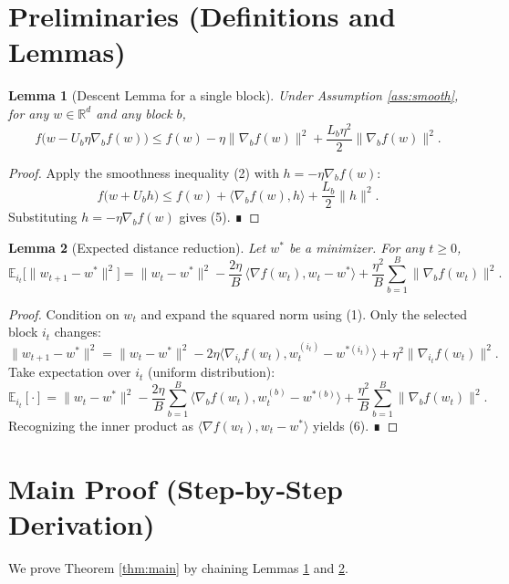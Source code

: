 \documentclass{article}
\newtheorem{lemma}{Lemma}
\newcommand{\E}{\mathbb{E}}
\newcommand{\R}{\mathbb{R}}
\begin{document}
\newpage
\section*{Preliminaries (Definitions and Lemmas)}
\begin{lemma}[Descent Lemma for a single block]\label{lem:descent}
Under Assumption \ref{ass:smooth}, for any $w\in\R^{d}$ and any block $b$,
\[
f\!\big(w-U_{b}\eta\nabla_{b}f(w)\big)
\le
f(w)-\eta\|\nabla_{b}f(w)\|^{2}
+\frac{L_{b}\eta^{2}}{2}\|\nabla_{b}f(w)\|^{2}.
\tag{5}
\]
\end{lemma}
\begin{proof}
Apply the smoothness inequality (2) with $h=-\eta\nabla_{b}f(w)$:
\[
f\!\big(w+U_{b}h\big)\le f(w)+\langle\nabla_{b}f(w),h\rangle+\frac{L_{b}}{2}\|h\|^{2}.
\]
Substituting $h=-\eta\nabla_{b}f(w)$ gives (5). ∎
\end{proof}

\begin{lemma}[Expected distance reduction]\label{lem:dist}
Let $w^{*}$ be a minimizer. For any $t\ge0$,
\[
\E_{i_{t}}\!\big[\|w_{t+1}-w^{*}\|^{2}\big]
=
\|w_{t}-w^{*}\|^{2}
-\frac{2\eta}{B}\,\langle\nabla f(w_{t}),w_{t}-w^{*}\rangle
+\frac{\eta^{2}}{B}\sum_{b=1}^{B}\|\nabla_{b}f(w_{t})\|^{2}.
\tag{6}
\]
\end{lemma}
\begin{proof}
Condition on $w_{t}$ and expand the squared norm using (1).  
Only the selected block $i_{t}$ changes:
\[
\|w_{t+1}-w^{*}\|^{2}
=
\|w_{t}-w^{*}\|^{2}
-2\eta\langle\nabla_{i_{t}}f(w_{t}),w_{t}^{(i_{t})}-w^{*(i_{t})}\rangle
+\eta^{2}\|\nabla_{i_{t}}f(w_{t})\|^{2}.
\]
Take expectation over $i_{t}$ (uniform distribution):
\[
\E_{i_{t}}[\cdot]
=
\|w_{t}-w^{*}\|^{2}
-\frac{2\eta}{B}\sum_{b=1}^{B}\langle\nabla_{b}f(w_{t}),w_{t}^{(b)}-w^{*(b)}\rangle
+\frac{\eta^{2}}{B}\sum_{b=1}^{B}\|\nabla_{b}f(w_{t})\|^{2}.
\]
Recognizing the inner product as $\langle\nabla f(w_{t}),w_{t}-w^{*}\rangle$ yields (6). ∎
\end{proof}

\section*{Main Proof (Step‑by‑Step Derivation)}
We prove Theorem \ref{thm:main} by chaining Lemmas \ref{lem:descent} and \ref{lem:dist}.
\end{document}
